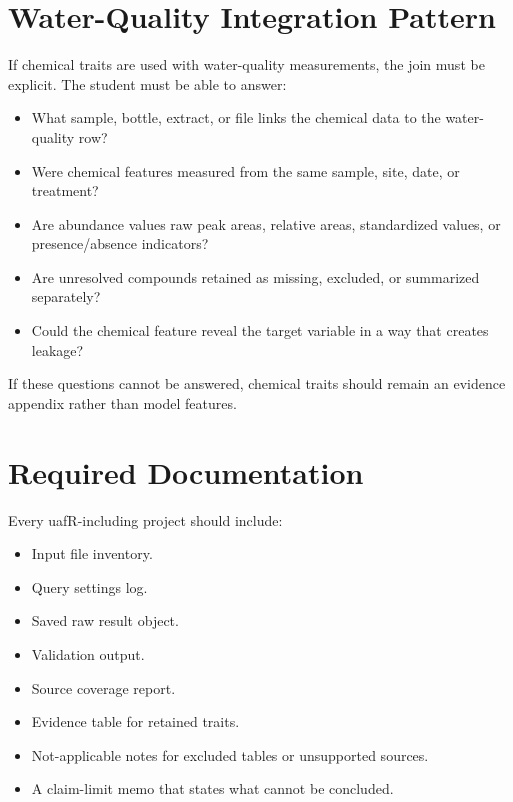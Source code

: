 \section{Water-Quality Integration Pattern}

If chemical traits are used with water-quality measurements, the join must be explicit. The student must be able to answer:
\begin{itemize}
  \item What sample, bottle, extract, or file links the chemical data to the water-quality row?
  \item Were chemical features measured from the same sample, site, date, or treatment?
  \item Are abundance values raw peak areas, relative areas, standardized values, or presence/absence indicators?
  \item Are unresolved compounds retained as missing, excluded, or summarized separately?
  \item Could the chemical feature reveal the target variable in a way that creates leakage?
\end{itemize}

If these questions cannot be answered, chemical traits should remain an evidence appendix rather than model features.

\section{Required Documentation}

Every uafR-including project should include:
\begin{itemize}
  \item Input file inventory.
  \item Query settings log.
  \item Saved raw result object.
  \item Validation output.
  \item Source coverage report.
  \item Evidence table for retained traits.
  \item Not-applicable notes for excluded tables or unsupported sources.
  \item A claim-limit memo that states what cannot be concluded.
\end{itemize}
